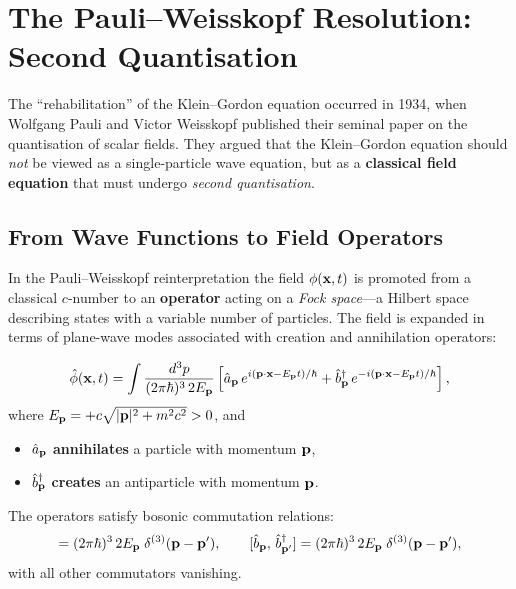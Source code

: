 \documentclass[12pt, a4paper]{article}
\theoremstyle{definition}
\begin{document}
\section{The Pauli--Weisskopf Resolution: Second Quantisation}
\label{sec:qft-resolution}

The ``rehabilitation'' of the Klein--Gordon equation occurred in 1934, when
Wolfgang Pauli and Victor Weisskopf published their seminal paper on the
quantisation of scalar fields.  They argued that the Klein--Gordon equation
should \emph{not} be viewed as a single-particle wave equation, but as a
\textbf{classical field equation} that must undergo \emph{second quantisation}.

\subsection{From Wave Functions to Field Operators}

In the Pauli--Weisskopf reinterpretation the field $\phi(\vb{x},t)$ is
promoted from a classical $c$-number to an \textbf{operator} acting on a
\emph{Fock space}---a Hilbert space describing states with a variable number
of particles.  The field is expanded in terms of plane-wave modes associated
with creation and annihilation operators:

\begin{derivation}
\begin{equation}\label{eq:field-operator}
    \hat{\phi}(\vb{x},t)
    = \int \frac{d^{3}p}{(2\pi\hbar)^{3}\,2E_{\vb{p}}}
      \left[
        \hat{a}_{\vb{p}}\,e^{i(\vb{p}\cdot\vb{x}-E_{\vb{p}}t)/\hbar}
        + \hat{b}^{\dagger}_{\vb{p}}\,
          e^{-i(\vb{p}\cdot\vb{x}-E_{\vb{p}}t)/\hbar}
      \right],
\end{equation}
where $E_{\vb{p}} = +c\sqrt{|\vb{p}|^{2}+m^{2}c^{2}} > 0$, and
\begin{itemize}
    \item $\hat{a}_{\vb{p}}$ \textbf{annihilates} a particle with momentum
          $\vb{p}$,
    \item $\hat{b}^{\dagger}_{\vb{p}}$ \textbf{creates} an antiparticle with
          momentum $\vb{p}$.
\end{itemize}
The operators satisfy bosonic commutation relations:
\begin{equation}
    [\hat{a}_{\vb{p}},\,\hat{a}^{\dagger}_{\vb{p}'}]
    = (2\pi\hbar)^{3}\,2E_{\vb{p}}\;\delta^{(3)}(\vb{p}-\vb{p}'),
    \qquad
    [\hat{b}_{\vb{p}},\,\hat{b}^{\dagger}_{\vb{p}'}]
    = (2\pi\hbar)^{3}\,2E_{\vb{p}}\;\delta^{(3)}(\vb{p}-\vb{p}'),
\end{equation}
with all other commutators vanishing.
\end{derivation}
\end{document}
